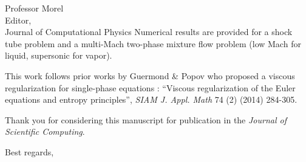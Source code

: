 \begin{letter}{Professor Morel\\
    Editor,\\
    Journal of Computational Physics}
Numerical results are provided for a shock tube problem and a multi-Mach two-phase mixture flow problem (low Mach for liquid, supersonic for vapor).


This work follows prior works by Guermond \& Popov who proposed a viscous regularization for single-phase equations : ``Viscous regularization of the Euler equations and entropy principles'', {\it SIAM J. Appl. Math} 74 (2) (2014) 284-305.


Thank you for considering this manuscript for publication in the {\it Journal of Scientific Computing}.

\vspace{0.25cm}



\closing{Best regards, }

\end{letter}


